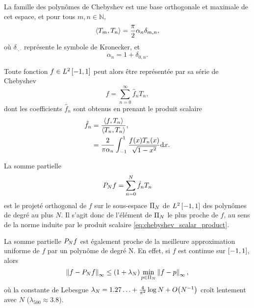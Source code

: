La famille des polynômes de Chebyshev est une base orthogonale et maximale de cet espace, et pour tous $m,n \in \mathbb{N}$,
\begin{equation}
	\scalprod{T_m}{T_n} =
	\frac{\pi}{2} \alpha_n \delta_{m,n},
	\label{eq:chebyshev_orthogonality}
\end{equation}
où $\delta_{\cdot,\cdot}$ représente le symbole de Kronecker, et
\begin{equation}
	\alpha_n = 
	1 + \delta_{0,n}.
\end{equation}

Toute fonction $f \in \Ltwospace$ peut alors être représentée par sa série de Chebyshev
\begin{equation}
	f = \sum_{n=0}^{\infty} \hat{f}_n T_n,
	\label{eq:chebyshev_series}
\end{equation}
dont les coefficients $\hat{f}_n$ sont obtenus en prenant le produit scalaire
\begin{align}
	\hat{f}_n 
	&= \frac{\scalprod{f}{T_n}}{\scalprod{T_n}{T_n}}, \nonumber \\
	&= \frac{2}{\pi \alpha_n} \int_{-1}^{1} \frac{f(x) T_n(x)}{\sqrt{1 - x^2}} \dx{x} .
	\label{eq:chebyshev_series_coeffs}
\end{align}

La somme partielle
\begin{equation}
	\truncseries{f}{N} = \sum_{n=0}^{N} \hat{f}_n T_n
	\label{chebyshev_truncated_series}
\end{equation}
est le projeté orthogonal de $f$ sur le sous-espace $\polyspace{N}$ de $\Ltwospace$ des polynômes de degré au plus $N$.
Il s'agit donc de l'élément de $\polyspace{N}$ le plus proche de $f$, au sens de la norme induite par le produit scalaire \eqref{eq:chebyshev_scalar_product}.\par
La somme partielle $\truncseries{f}{N}$ est également proche de la meilleure approximation uniforme de $f$ par un polynôme de degré N. 
En effet, si $f$ est continue sur $\chebinterval$, alors
\begin{equation}
	\norminf{f - \truncseries{f}{N}} 
	\leq 
	\left(1 + \lambda_N \right) 
	\min_{p \in \polyspace{N}} \norminf{f - p},
	\label{eq:chebyshev_near_minimax}
\end{equation}
où la constante de Lebesgue $\lambda_N = 1.27\ldots + \frac{4}{\pi^2} \log N + \bigO{N^{-1}}$ croît lentement avec $N$ ($\lambda_{500} \approx 3.8$).\par

